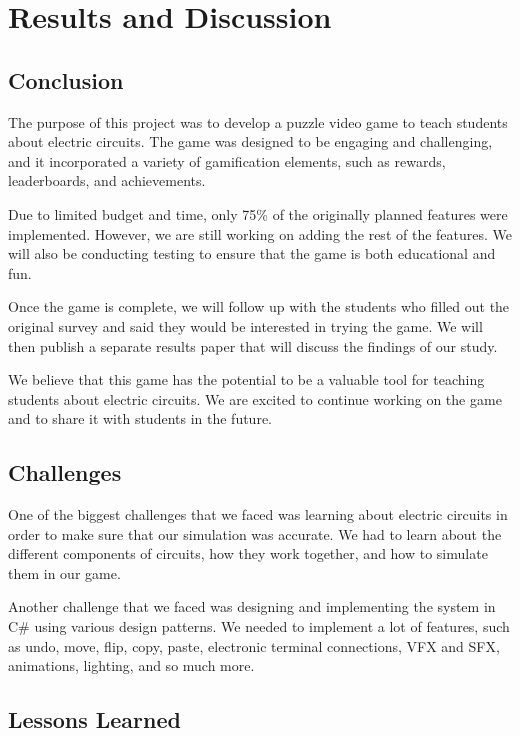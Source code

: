 \documentclass[../main.tex]{subfiles}
\begin{document}
\chapter{Results and Discussion}
\section{Conclusion}

The purpose of this project was to develop a puzzle video game to teach students about electric circuits. The game was designed to be engaging and challenging, and it incorporated a variety of gamification elements, such as rewards, leaderboards, and achievements.

Due to limited budget and time, only 75\% of the originally planned features were implemented. However, we are still working on adding the rest of the features. We will also be conducting testing to ensure that the game is both educational and fun.

Once the game is complete, we will follow up with the students who filled out the original survey and said they would be interested in trying the game. We will then publish a separate results paper that will discuss the findings of our study.

We believe that this game has the potential to be a valuable tool for teaching students about electric circuits. We are excited to continue working on the game and to share it with students in the future.

\section{Challenges}

One of the biggest challenges that we faced was learning about electric circuits in order to make sure that our simulation was accurate. We had to learn about the different components of circuits, how they work together, and how to simulate them in our game.

Another challenge that we faced was designing and implementing the system in C\# using various design patterns. We needed to implement a lot of features, such as undo, move, flip, copy, paste, electronic terminal connections, VFX and SFX, animations, lighting, and so much more.

\section{Lessons Learned}
\end{document}
